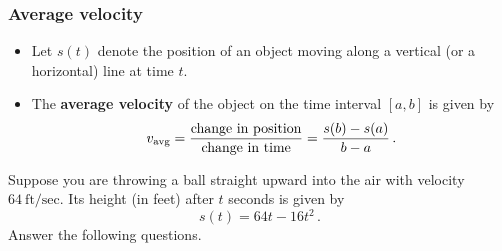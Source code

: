 \documentclass[10pt,t,presentation,ignorenonframetext,aspectratio=169]{beamer}
\title[\course]{\lecTitle}
\institute[Ohio State]
{
  \medskip
}
\date[\week]{\semester}
\author{Tae Eun Kim, Ph.D.}
\begin{document}
\begin{frame}
  \titlepage
\end{frame}



\begin{frame}
  \frametitle{Average velocity}
  \begin{itemize}
  \item Let $s(t)$ denote the position of an object moving along a vertical
    (or a horizontal) line at time $t$.
  \item The \textbf{average velocity} of the object on the time interval $[a, b]$ is given by
    \[
      v_{\rm avg}
      = \frac{\text{change in position}}{\text{change in time}}
      = \frac{s(b)-s(a)}{b-a} \,.
    \]
  \end{itemize}
\end{frame}

\begin{frame}
  \vs
  \begin{example}
    Suppose you are throwing a ball straight upward into the air with velocity $64\ \text{ft}/\text{sec}$. Its height (in feet) after $t$ seconds is given by
    \[
      s(t) = 64t - 16t^2 \,.
    \]
    Answer the following questions.
  \end{example}
\end{frame}
\end{document}
